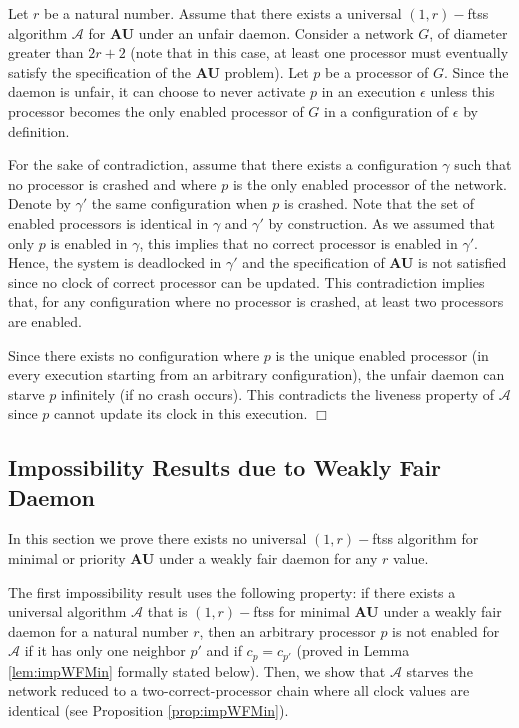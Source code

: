\documentclass[11pt,english,letterpaper]{article}
\newenvironment{proof}{{\noindent\bf Proof. } }{{\hfill $\Box$}}
\begin{document}
\begin{proof}
Let $r$ be a natural number. Assume that there exists a universal $(1,r)-$ftss algorithm $\mathcal{A}$ for \textbf{AU} under an unfair daemon. Consider a network $G$, of diameter greater than $2r+2$ (note that in this case, at least one processor must eventually satisfy the specification of the \textbf{AU} problem). Let $p$ be a processor of $G$. Since the daemon is unfair, it can choose to never activate $p$ in an execution $\epsilon$ unless this processor becomes the only enabled processor of $G$ in a configuration of $\epsilon$ by definition.
			
For the sake of contradiction, assume that there exists a configuration $\gamma$ such that no processor is crashed and where $p$ is the only enabled processor of the network. Denote by $\gamma'$ the same configuration when $p$ is crashed. Note that the set of enabled processors is identical in $\gamma$ and $\gamma'$ by construction. As we assumed that only $p$ is enabled in $\gamma$, this implies that no correct processor is enabled in $\gamma'$. Hence, the system is deadlocked in $\gamma'$ and the specification of \textbf{AU} is not satisfied since no clock of correct processor can be updated. This contradiction implies that, for any configuration where no processor is crashed, at least two processors are enabled. 

Since there exists no configuration where $p$ is the unique enabled processor (in every execution starting from an arbitrary configuration), the unfair daemon can starve $p$ infinitely (if no crash occurs). This contradicts the liveness property of $\mathcal{A}$ since $p$ cannot update its clock in this execution.
\end{proof}

\subsection{Impossibility Results due to Weakly Fair Daemon}

In this section we prove there exists no universal $(1,r)-$ftss algorithm for minimal or priority \textbf{AU} under a weakly fair daemon for any $r$ value. 

The first impossibility result  uses the following property: if there exists a universal algorithm $\mathcal{A}$ that is $(1,r)-$ftss for minimal \textbf{AU} under a weakly fair daemon for a natural number $r$, then an arbitrary processor $p$ is not enabled for $\mathcal{A}$ if it has only one neighbor $p'$ and if $c_{p}=c_{p'}$ (proved in Lemma \ref{lem:impWFMin} formally stated below). Then, we show that $\mathcal{A}$ starves the network reduced to a two-correct-processor chain where all clock values are identical (see Proposition \ref{prop:impWFMin}).
\end{document}
